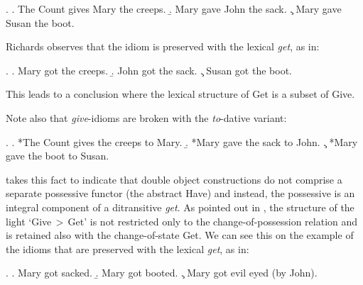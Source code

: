 \ex. 
\a. The Count gives Mary the creeps.
\b. Mary gave John the sack.
\c. Mary gave Susan the boot.

Richards observes that the idiom is preserved with the lexical  \textit{get}, as in:

\ex. 
\a. Mary got the creeps.
\b. John got the sack.
\c. Susan got the boot.

This leads to a conclusion where the lexical structure of Get  is a subset of Give. 
\par 
Note also that \textit{give}-idioms are broken with the \textit{to}-dative variant:

\ex.
\a. *The Count gives the creeps to Mary.
\b. *Mary gave the sack to John.
\c. *Mary gave the boot to Susan.

\cite{Richards2001} takes this fact to indicate that double object constructions do not comprise a separate possessive functor (the abstract  Have) and instead, the possessive is an integral component of a ditransitive \textit{get}. As pointed out in \citet[\S4.2.3]{NU}, the  structure of the light `Give\,$>$\,Get' is not restricted only to the change-of-possession relation and is retained also with the change-of-state Get.  We can see this on the example of the idioms that are preserved with the lexical  \textit{get}, as in:

\ex.
\a. Mary got sacked.
\b. Mary got booted.
\c. Mary got evil eyed (by John).

